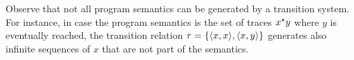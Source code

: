 \begin{remark}
  Observe that not all program semantics can be generated by a transition system. For instance, in case the program semantics is the set of traces $x^\star y$ where $y$ is eventually reached, the transition relation $\tau = \{\langle x, x \rangle, \langle x, y \rangle\}$ generates also infinite sequences of $x$ that are not part of the semantics.
\end{remark}






